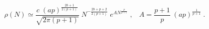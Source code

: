 \begin{equation}\label{rhoN}
\rho(N) \simeq \frac{c \; (a p)^{\frac{2 b + 1}{2 (p + 1)}}}
{\sqrt{2 \pi (p + 1)}} \; 
N^{- \frac{2 b + p + 2}{2 (p + 1)}} \; 
e^{A N^{\frac{p}{p + 1}}} \; , \; \; \; 
A = \frac{p + 1}{p} \; (a p)^{\frac{1}{p + 1}} \; . 
\end{equation}

